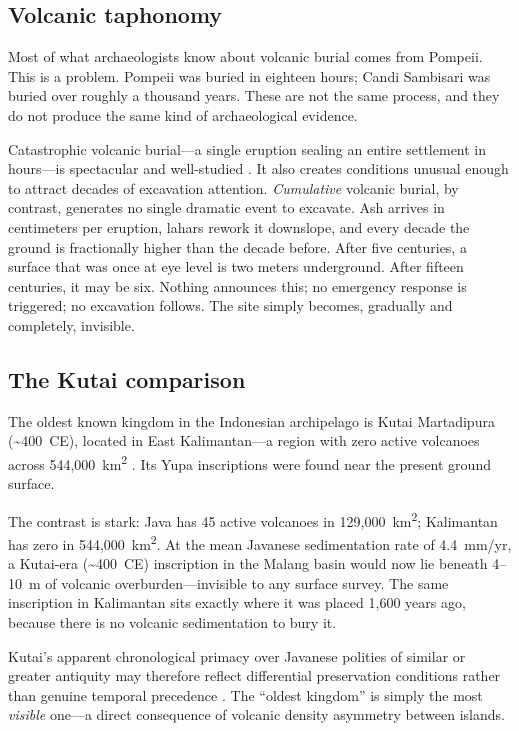 \documentclass[12pt,a4paper]{article}
\begin{document}
\subsection{Volcanic taphonomy}

Most of what archaeologists know about volcanic burial comes from Pompeii. This is a problem. Pompeii was buried in eighteen hours; Candi Sambisari was buried over roughly a thousand years. These are not the same process, and they do not produce the same kind of archaeological evidence.

Catastrophic volcanic burial---a single eruption sealing an entire settlement in hours---is spectacular and well-studied \citep{sigurdsson1985,doumas1983,sheets1992}. It also creates conditions unusual enough to attract decades of excavation attention. \textit{Cumulative} volcanic burial, by contrast, generates no single dramatic event to excavate. Ash arrives in centimeters per eruption, lahars rework it downslope, and every decade the ground is fractionally higher than the decade before. After five centuries, a surface that was once at eye level is two meters underground. After fifteen centuries, it may be six. Nothing announces this; no emergency response is triggered; no excavation follows. The site simply becomes, gradually and completely, invisible.

\subsection{The Kutai comparison}

The oldest known kingdom in the Indonesian archipelago is Kutai Martadipura (\textasciitilde400~CE), located in East Kalimantan---a region with zero active volcanoes across 544,000~km\textsuperscript{2} \citep{vogel1918}. Its Yupa inscriptions were found near the present ground surface.

The contrast is stark: Java has 45 active volcanoes in 129,000~km\textsuperscript{2}; Kalimantan has zero in 544,000~km\textsuperscript{2}. At the mean Javanese sedimentation rate of 4.4~mm/yr, a Kutai-era (\textasciitilde400~CE) inscription in the Malang basin would now lie beneath 4--10~m of volcanic overburden---invisible to any surface survey. The same inscription in Kalimantan sits exactly where it was placed 1,600 years ago, because there is no volcanic sedimentation to bury it.

Kutai's apparent chronological primacy over Javanese polities of similar or greater antiquity may therefore reflect differential preservation conditions rather than genuine temporal precedence \citep{coedes1968,miksic2004}. The ``oldest kingdom'' is simply the most \textit{visible} one---a direct consequence of volcanic density asymmetry between islands.
\end{document}
